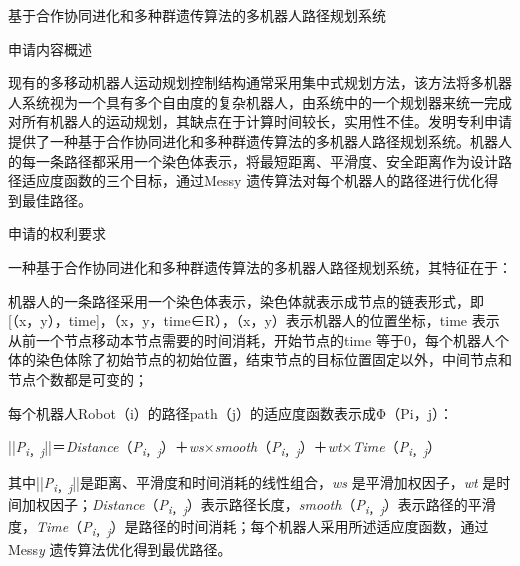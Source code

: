 {\setlength{\parindent}{20.6bp}基于合作协同进化和多种群遗传算法的多机器人路径规划系统\par}

{\setlength{\parindent}{20.1bp}申请内容概述\par}

{\setlength{\parindent}{20.6bp}现有的多移动机器人运动规划控制结构通常采用集中式规划方法，该方法将多机器人系统视为一个具有多个自由度的复杂机器人，由系统中的一个规划器来统一完成对所有机器人的运动规划，其缺点在于计算时间较长，实用性不佳。发明专利申请提供了一种基于合作协同进化和多种群遗传算法的多机器人路径规划系统。机器人的每一条路径都采用一个染色体表示，将最短距离、平滑度、安全距离作为设计路径适应度函数的三个目标，通过Messy 遗传算法对每个机器人的路径进行优化得到最佳路径。\par}

{\setlength{\parindent}{20.1bp}申请的权利要求\par}

{\setlength{\parindent}{20.6bp}一种基于合作协同进化和多种群遗传算法的多机器人路径规划系统，其特征在于：\par}

{\setlength{\parindent}{15.3bp}机器人的一条路径采用一个染色体表示，染色体就表示成节点的链表形式，即[（x，y），time]，（x，y，time∈R），（x，y）表示机器人的位置坐标，time 表示从前一个节点移动本节点需要的时间消耗，开始节点的time 等于0，每个机器人个体的染色体除了初始节点的初始位置，结束节点的目标位置固定以外，中间节点和节点个数都是可变的；\par}

{\setlength{\parindent}{15.3bp}每个机器人Robot（i）的路径path（j）的适应度函数表示成Φ（Pi，j）：\par}

{\setlength{\parindent}{20.6bp}||\textit{P}\textsubscript{\textit{i}}\textsubscript{，}\textsubscript{\textit{j}}||＝\textit{Distance}（\textit{P}\textsubscript{\textit{i}}\textsubscript{，}\textsubscript{\textit{j}}）＋\textit{ws}×\textit{smooth}（\textit{P}\textsubscript{\textit{i}}\textsubscript{，}\textsubscript{\textit{j}}）＋\textit{wt}×\textit{Time}（\textit{P}\textsubscript{\textit{i}}\textsubscript{，}\textsubscript{\textit{j}}）\par}

{\setlength{\parindent}{20.6bp}其中||\textit{P}\textsubscript{\textit{i}}\textsubscript{，}\textsubscript{\textit{j}}||是距离、平滑度和时间消耗的线性组合，\textit{ws} 是平滑加权因子，\textit{wt} 是时间加权因子；\textit{Distance}（\textit{P}\textsubscript{\textit{i}}\textsubscript{，}\textsubscript{\textit{j}}）表示路径长度，\textit{smooth}（\textit{P}\textsubscript{\textit{i}}\textsubscript{，}\textsubscript{\textit{j}}）表示路径的平滑度，\textit{Time}（\textit{P}\textsubscript{\textit{i}}\textsubscript{，}\textsubscript{\textit{j}}）是路径的时间消耗；每个机器人采用所述适应度函数，通过Mess\textit{y} 遗传算法优化得到最优路径。\par}

